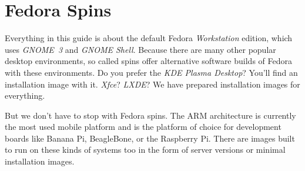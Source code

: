 \section*{Fedora Spins}

Everything in this guide is about the default Fedora \emph{Workstation} edition, which uses \emph{GNOME~3} and \emph{GNOME Shell}. Because there are many other popular desktop environments, so called spins offer alternative software builds of Fedora with these environments. Do you prefer the \emph{KDE Plasma Desktop}? You'll find an installation image with it. \emph{Xfce}? \emph{LXDE}? We have prepared installation images for everything.

But we don't have to stop with Fedora spins. The ARM architecture is currently the most used mobile platform and is the platform of choice for development boards like Banana Pi, BeagleBone, or the Raspberry Pi. There are images built to run on these kinds of systems too in the form of server versions or minimal installation images.
\endinput
